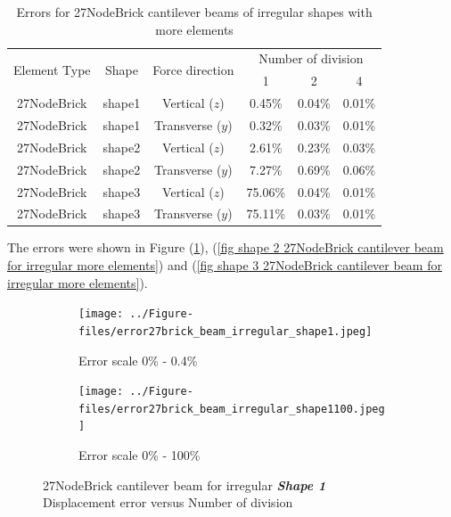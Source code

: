 \documentclass[fleqn,11pt]{article}
\begin{document}
\begin{table}[H]
  \centering
  \caption{Errors for 27NodeBrick cantilever beams of irregular shapes with more elements}
  \label{table Errors for 27NodeBrick cantilever beams of irregular shapes with more elements}
\begin{tabular}{|c|c|c|c|c|c|}
\hline
\multirow{2}{*}{Element Type} & \multirow{2}{*}{Shape}  & \multirow{2}{*}{Force direction}  & \multicolumn{3}{|c|}{Number of division} \\  \cline{4-6}
                        &        &                  &  1 &  2 &  4  \\ \hline
27NodeBrick   & shape1      & Vertical ($z$)   & 0.45\%  & 0.04\% & 0.01\%    \\ \hline
27NodeBrick   & shape1      & Transverse ($y$) & 0.32\%  & 0.03\% & 0.01\%    \\ \hline
27NodeBrick   & shape2      & Vertical ($z$)   & 2.61\%  & 0.23\% & 0.03\%    \\ \hline
27NodeBrick   & shape2      & Transverse ($y$) & 7.27\%  & 0.69\% & 0.06\%    \\ \hline
27NodeBrick   & shape3      & Vertical ($z$)   & 75.06\% & 0.04\% & 0.01\%    \\ \hline
27NodeBrick   & shape3      & Transverse ($y$) & 75.11\% & 0.03\% & 0.01\%    \\
\hline
\end{tabular}
\end{table}


The errors were shown in Figure (\ref{fig shape 1 27NodeBrick cantilever beam for irregular more elements}), (\ref{fig shape 2 27NodeBrick cantilever beam for irregular more elements}) and (\ref{fig shape 3 27NodeBrick cantilever beam for irregular more elements}). 

\begin{figure}[H]
  \begin{subfigure}{0.5\textwidth}
    \centering
    \texttt{[image: ../Figure-files/error27brick\_beam\_irregular\_shape1.jpeg]}
    \caption{Error scale 0\% - 0.4\%}
  \end{subfigure}
  \begin{subfigure}{0.5\textwidth}
    \centering
    \texttt{[image: ../Figure-files/error27brick\_beam\_irregular\_shape1100.jpeg]}
    \caption{Error scale 0\% - 100\%}
  \end{subfigure}
  \captionsetup{justification=centering,margin=3cm}
  \caption{27NodeBrick cantilever beam for irregular \textbf{\emph{Shape 1}}\\
      Displacement error   versus   Number of division}
  \label{fig shape 1 27NodeBrick cantilever beam for irregular more elements}
\end{figure}
\end{document}
